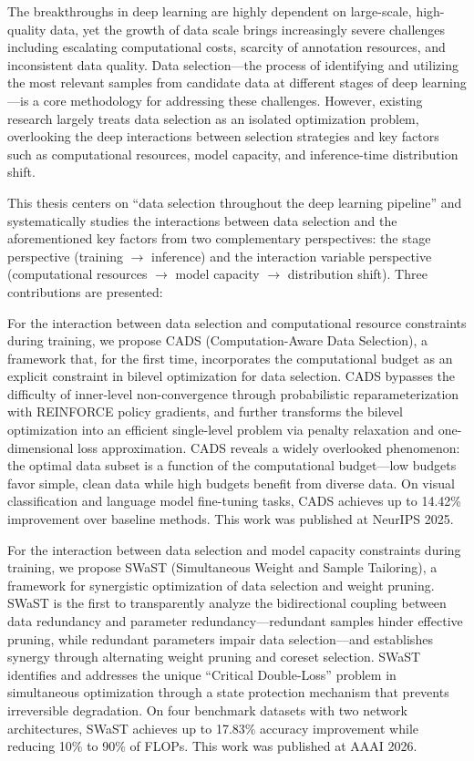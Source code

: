 \documentclass[type=doctor]{fduthesis}
\begin{document}
\begin{abstract*}
The breakthroughs in deep learning are highly dependent on large-scale, high-quality data, yet the growth of data scale brings increasingly severe challenges including escalating computational costs, scarcity of annotation resources, and inconsistent data quality. Data selection---the process of identifying and utilizing the most relevant samples from candidate data at different stages of deep learning---is a core methodology for addressing these challenges. However, existing research largely treats data selection as an isolated optimization problem, overlooking the deep interactions between selection strategies and key factors such as computational resources, model capacity, and inference-time distribution shift.

This thesis centers on ``data selection throughout the deep learning pipeline'' and systematically studies the interactions between data selection and the aforementioned key factors from two complementary perspectives: the stage perspective (training $\to$ inference) and the interaction variable perspective (computational resources $\to$ model capacity $\to$ distribution shift). Three contributions are presented:

For the interaction between data selection and computational resource constraints during training, we propose CADS (Computation-Aware Data Selection), a framework that, for the first time, incorporates the computational budget as an explicit constraint in bilevel optimization for data selection. CADS bypasses the difficulty of inner-level non-convergence through probabilistic reparameterization with REINFORCE policy gradients, and further transforms the bilevel optimization into an efficient single-level problem via penalty relaxation and one-dimensional loss approximation. CADS reveals a widely overlooked phenomenon: the optimal data subset is a function of the computational budget---low budgets favor simple, clean data while high budgets benefit from diverse data. On visual classification and language model fine-tuning tasks, CADS achieves up to 14.42\% improvement over baseline methods. This work was published at NeurIPS 2025.

For the interaction between data selection and model capacity constraints during training, we propose SWaST (Simultaneous Weight and Sample Tailoring), a framework for synergistic optimization of data selection and weight pruning. SWaST is the first to transparently analyze the bidirectional coupling between data redundancy and parameter redundancy---redundant samples hinder effective pruning, while redundant parameters impair data selection---and establishes synergy through alternating weight pruning and coreset selection. SWaST identifies and addresses the unique ``Critical Double-Loss'' problem in simultaneous optimization through a state protection mechanism that prevents irreversible degradation. On four benchmark datasets with two network architectures, SWaST achieves up to 17.83\% accuracy improvement while reducing 10\% to 90\% of FLOPs. This work was published at AAAI 2026.


\end{abstract*}
\end{document}
